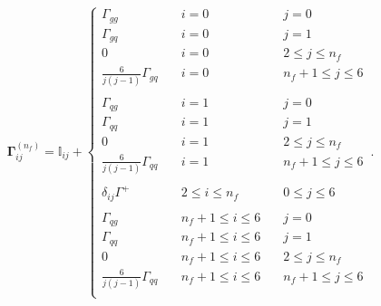 \documentclass[10pt,a4paper]{article}
\begin{document}
\begin{equation}
  {\bm\Gamma}^{(n_f)}_{ij}=\mathbb{I}_{ij}+
  \left\{
\begin{array}{lll}
\Gamma_{gg} & \quad i = 0 &\quad j = 0\\
\Gamma_{gq} & \quad i = 0 & \quad j=1\\
0 &\quad i = 0 & \quad 2 \leq j \leq n_f\\
\frac{6}{j(j-1)}\Gamma_{gq} &\quad i = 0 & \quad n_f+1 \leq j \leq 6\\
\\
\Gamma_{qg} & \quad i = 1 & \quad j = 0\\
\Gamma_{qq} & \quad i = 1 & \quad j = 1\\
0 &\quad i = 1 & \quad 2 \leq j \leq n_f\\
\frac{6}{j(j-1)}\Gamma_{qq} &\quad i = 1 & \quad n_f+1 \leq j \leq 6\\
\\
\delta_{ij}\Gamma^+ & \quad 2 \leq i \leq n_f & \quad 0 \leq j \leq 6\\
\\
\Gamma_{qg} & \quad n_f+1 \leq i \leq 6  &\quad j = 0\\
\Gamma_{qq} & \quad n_f+1 \leq i \leq 6  & \quad j=1\\
0 &\quad n_f+1 \leq i \leq 6 & \quad 2 \leq j \leq n_f\\
\frac{6}{j(j-1)}\Gamma_{qq} &\quad n_f+1 \leq i \leq 6 & \quad n_f+1 \leq j \leq 6\\
\end{array}
\right.\,.
\label{eq:evolopalg}
\end{equation}
\end{document}
